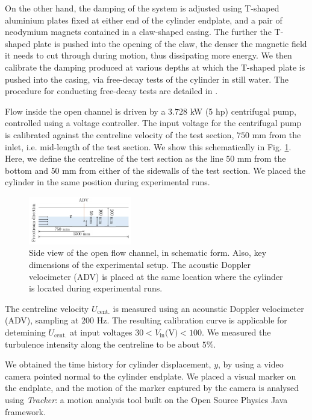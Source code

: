 \documentclass[a4paper,fleqn]{cas-sc}
\begin{document}
On the other hand, the damping of the system is adjusted using T-shaped aluminium plates fixed at either end of the cylinder endplate, and a pair of neodymium magnets contained in a claw-shaped casing. The further the T-shaped plate is pushed into the opening of the claw, the denser the magnetic field it needs to cut through during motion, thus dissipating more energy. We then calibrate the damping produced at various depths at which the T-shaped plate is pushed into the casing, via free-decay tests of the cylinder in still water. The procedure for conducting free-decay tests are detailed in \citet{Raghavan2007}.

Flow inside the open channel is driven by a $3.728$ kW (5 hp) centrifugal pump, controlled using a voltage controller. The input voltage for the centrifugal pump is calibrated against the centreline velocity of the test section, $750$ mm from the inlet, i.e. mid-length of the test section. We show this schematically in Fig. \ref{fig:keyDimensions}. Here, we define the centreline of the test section as the line $50$ mm from the bottom and $50$ mm from either of the sidewalls of the test section. We placed the cylinder in the same position during experimental runs.

\begin{figure}
  \centering
  \includegraphics[width=0.4\textwidth]{figs/figure4}
  \caption{Side view of the open flow channel, in schematic form. Also, key dimensions of the experimental setup. The acoustic Doppler velocimeter (ADV) is placed at the same location where the cylinder is located during experimental runs.}
  \label{fig:keyDimensions}
\end{figure}

The centreline velocity $U_{\text{cent.}}$ is measured using an acounstic Doppler velocimeter (ADV), sampling at $200$ Hz. The resulting calibration curve is applicable for detemining $U_{\text{cent.}}$ at input voltages $30 < V_{\text{in}} \text{(V)} < 100$. We measured the turbulence intensity along the centreline to be about $5\%$.

We obtained the time history for cylinder displacement, $y$, by using a video camera pointed normal to the cylinder endplate. We placed a visual marker on the endplate, and the motion of the marker captured by the camera is analysed using \textit{Tracker}: a motion analysis tool built on the Open Source Physics Java framework.
\end{document}
